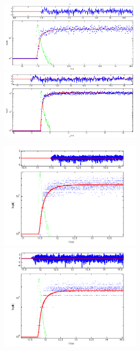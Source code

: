 \begin{figure}[htbp]
\begin{center}
\includegraphics[width=7cm]{../Pictures/Chapter_7/2612.png}
\includegraphics[width=7cm]{../Pictures/Chapter_7/0_44.png}
\end{center}
\caption[]{}
\label{fig:luag_2}
\end{figure}

\begin{figure}[htbp]
\begin{center}
\includegraphics[width=7cm]{../Pictures/Chapter_7/luag_2735_0_13.png}
\includegraphics[width=7cm]{../Pictures/Chapter_7/luagpr.png}
\end{center}
\caption[]{}
\label{fig:pr_bgo}
\end{figure}

